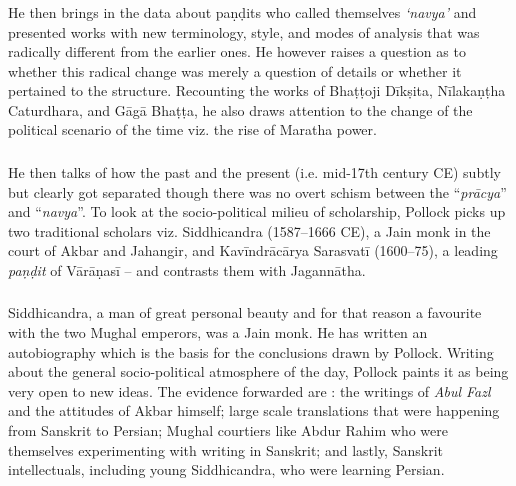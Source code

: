\subsubsection{} He then brings in the data about paṇḍits who called themselves {\sl ‘navya’} and presented works with new terminology, style, and modes of analysis that was radically different from the earlier ones. He however raises a question as to whether this radical change was merely a question of details or whether it pertained to the structure. Recounting the works of Bhaṭṭoji Dīkṣita, Nīlakaṇṭha Caturdhara, and Gāgā Bhaṭṭa, he also draws attention to the change of the political scenario of the time viz. the rise of Maratha power.

\subsubsection{} He then talks of how the past and the present (i.e. mid-17th century CE) subtly but clearly got separated though there was no overt schism between the “{\sl prācya}” and “{\sl navya}”. To look at the socio-political milieu of scholarship, Pollock picks up two traditional scholars viz. Siddhicandra (1587--1666 CE), a Jain monk in the court of Akbar and Jahangir, and Kavīndrācārya Sarasvatī (1600--75), a leading {\sl paṇḍit} of Vārāṇasī -- and contrasts them with Jagannātha.

\subsubsection{} Siddhicandra, a man of great personal beauty and for that reason a favourite with the two Mughal emperors, was a Jain monk. He has written an autobiography which is the basis for the conclusions drawn by Pollock. Writing about the general socio-political atmosphere of the day, Pollock paints it as being very open to new ideas. The evidence forwarded are : the writings of {\sl Abul Fazl} and the attitudes of Akbar himself; large scale translations that were happening from Sanskrit to Persian; Mughal courtiers like Abdur Rahim who were themselves experimenting with writing in Sanskrit; and lastly, Sanskrit intellectuals, including young Siddhicandra, who were learning Persian.

